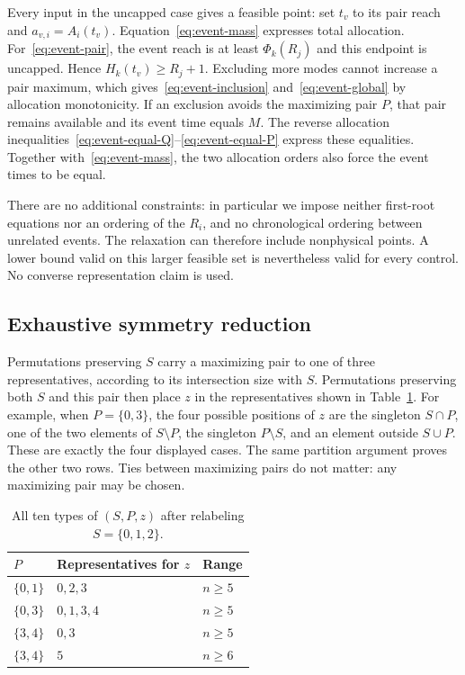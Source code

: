Every input in the uncapped case gives a feasible point: set $t_v$ to its
pair reach and $a_{v,i}=A_i(t_v)$. Equation~\eqref{eq:event-mass}
expresses total allocation. For~\eqref{eq:event-pair}, the event reach
is at least $\Phi_k(R_j)$ and this endpoint is uncapped. Hence
$H_k(t_v)\ge R_j+1$. Excluding more modes cannot increase a pair maximum,
which gives~\eqref{eq:event-inclusion} and~\eqref{eq:event-global} by
allocation monotonicity. If an exclusion avoids the maximizing pair $P$,
that pair remains available and its event time equals $M$. The reverse
allocation inequalities~\eqref{eq:event-equal-Q}--\eqref{eq:event-equal-P}
express these equalities. Together with~\eqref{eq:event-mass}, the two
allocation orders also force the event times to be equal.

There are no additional constraints: in particular we impose neither
first-root equations nor an ordering of the $R_i$, and no chronological
ordering between unrelated events. The relaxation can therefore include
nonphysical points. A lower bound valid on this larger feasible set is
nevertheless valid for every control. No converse representation claim
is used.

\subsection{Exhaustive symmetry reduction}\label{subsec:pair-symmetry}

Permutations preserving $S$ carry a maximizing pair to one of three
representatives, according to its intersection size with $S$. Permutations
preserving both $S$ and this pair then place $z$ in the representatives
shown in Table~\ref{tab:pair-types}. For example, when $P=\{0,3\}$,
the four possible positions of $z$ are the singleton $S\cap P$, one of
the two elements of $S\setminus P$, the singleton $P\setminus S$, and
an element outside $S\cup P$. These are exactly the four displayed cases.
The same partition argument proves the other two rows. Ties between
maximizing pairs do not matter: any maximizing pair may be chosen.

\begin{table}[tb]
\centering
\begin{tabular}{lll}
\toprule
$P$ & Representatives for $z$ & Range\\
\midrule
$\{0,1\}$ & $0,2,3$ & $n\ge5$\\
$\{0,3\}$ & $0,1,3,4$ & $n\ge5$\\
$\{3,4\}$ & $0,3$ & $n\ge5$\\
$\{3,4\}$ & $5$ & $n\ge6$\\
\bottomrule
\end{tabular}
\caption{All ten types of $(S,P,z)$ after relabeling $S=\{0,1,2\}$.}
\label{tab:pair-types}
\end{table}

